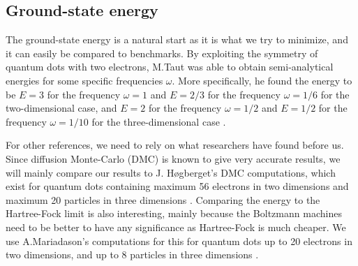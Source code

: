 \subsection{Ground-state energy} \label{sec:groundstateenergy}
The ground-state energy is a natural start as it is what we try to minimize, and it can easily be compared to benchmarks. By exploiting the symmetry of quantum dots with two electrons, M.Taut was able to obtain semi-analytical energies for some specific frequencies $\omega$. More specifically, he found the energy to be $E=3$ for the frequency $\omega=1$ and $E=2/3$ for the frequency $\omega=1/6$ for the two-dimensional case, and $E=2$ for the frequency $\omega=1/2$ and $E=1/2$ for the frequency $\omega=1/10$ for the three-dimensional case \cite{taut_two_1993,taut_two_1994}.

For other references, we need to rely on what researchers have found before us. Since diffusion Monte-Carlo (DMC) is known to give very accurate results, we will mainly compare our results to J. Høgberget's DMC computations, which exist for quantum dots containing maximum 56 electrons in two dimensions and maximum 20 particles in three dimensions \cite{hogberget_quantum_2013}. Comparing the energy to the Hartree-Fock limit is also interesting, mainly because the Boltzmann machines need to be better to have any significance as Hartree-Fock is much cheaper. We use A.Mariadason's computations for this for quantum dots up to 20 electrons in two dimensions, and up to 8 particles in three dimensions \cite{mariadason_quantum_2018}.

